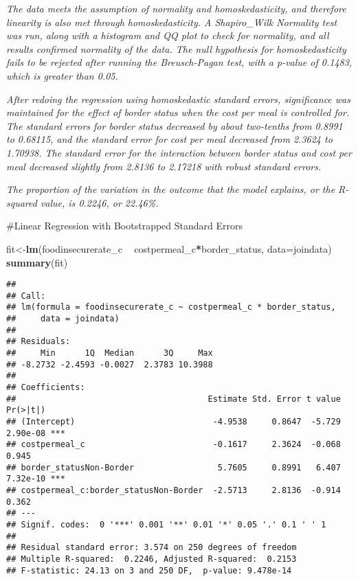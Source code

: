 \documentclass[]{article}
\newenvironment{Shaded}{\begin{snugshade}}{\end{snugshade}}
\newcommand{\DataTypeTok}[1]{\textcolor[rgb]{0.13,0.29,0.53}{#1}}
\newcommand{\KeywordTok}[1]{\textcolor[rgb]{0.13,0.29,0.53}{\textbf{#1}}}
\newcommand{\NormalTok}[1]{#1}
\newcommand{\OperatorTok}[1]{\textcolor[rgb]{0.81,0.36,0.00}{\textbf{#1}}}
\newcommand{\StringTok}[1]{\textcolor[rgb]{0.31,0.60,0.02}{#1}}
\begin{document}
\emph{The data meets the assumption of normality and homoskedasticity,
and therefore linearity is also met through homoskedasticity. A
Shapiro\_Wilk Normality test was run, along with a histogram and QQ plot
to check for normality, and all results confirmed normality of the data.
The null hypothesis for homoskedasticity fails to be rejected after
running the Breusch-Pagan test, with a p-value of 0.1483, which is
greater than 0.05.}

\emph{After redoing the regression using homoskedastic standard errors,
significance was maintained for the effect of border status when the
cost per meal is controlled for. The standard errors for border status
decreased by about two-tenths from 0.8991 to 0.68115, and the standard
error for cost per meal decreased from 2.3624 to 1.70938. The standard
error for the interaction between border status and cost per meal
decreased slightly from 2.8136 to 2.17218 with robust standard errors.}

\emph{The proportion of the variation in the outcome that the model
explains, or the R-squared value, is 0.2246, or 22.46\%.}

\#Linear Regression with Bootstrapped Standard Errors

\begin{Shaded}
\begin{Highlighting}[]
\NormalTok{fit<-}\KeywordTok{lm}\NormalTok{(foodinsecurerate_c }\OperatorTok{~}\StringTok{ }\NormalTok{costpermeal_c}\OperatorTok{*}\NormalTok{border_status, }\DataTypeTok{data=}\NormalTok{joindata)}
\KeywordTok{summary}\NormalTok{(fit)}
\end{Highlighting}
\end{Shaded}

\begin{verbatim}
## 
## Call:
## lm(formula = foodinsecurerate_c ~ costpermeal_c * border_status, 
##     data = joindata)
## 
## Residuals:
##     Min      1Q  Median      3Q     Max 
## -8.2732 -2.4593 -0.0027  2.3783 10.3988 
## 
## Coefficients:
##                                       Estimate Std. Error t value Pr(>|t|)    
## (Intercept)                            -4.9538     0.8647  -5.729 2.90e-08 ***
## costpermeal_c                          -0.1617     2.3624  -0.068    0.945    
## border_statusNon-Border                 5.7605     0.8991   6.407 7.32e-10 ***
## costpermeal_c:border_statusNon-Border  -2.5713     2.8136  -0.914    0.362    
## ---
## Signif. codes:  0 '***' 0.001 '**' 0.01 '*' 0.05 '.' 0.1 ' ' 1
## 
## Residual standard error: 3.574 on 250 degrees of freedom
## Multiple R-squared:  0.2246, Adjusted R-squared:  0.2153 
## F-statistic: 24.13 on 3 and 250 DF,  p-value: 9.478e-14
\end{verbatim}
\end{document}
